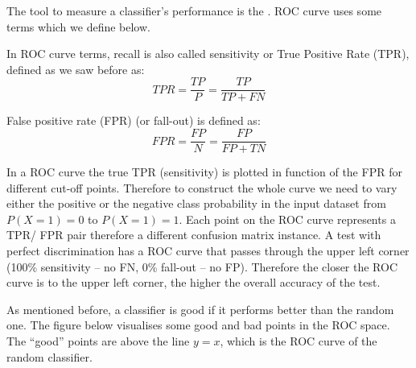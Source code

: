 \documentclass[a4paper]{article}
\begin{document}
The tool to measure a classifier's performance is the . ROC curve uses some terms which we define below.

\begin{definition}[sensitivity]
In ROC curve terms, recall is also called sensitivity or True Positive Rate (TPR), defined as we saw before as:
\begin{equation}
    TPR = \frac{TP}{P} = \frac{TP}{TP + FN}
\end{equation}
\end{definition}

\begin{definition}
False positive rate (FPR) (or fall-out) is defined as:
\begin{equation}
    FPR = \frac{FP}{N} = \frac{FP}{FP + TN}
\end{equation}
\end{definition}

In a ROC curve the true TPR (sensitivity) is plotted in function of the FPR for different cut-off points. Therefore to construct the whole curve we need to vary either the positive or the negative class probability in the input dataset from $P(X=1)=0$ to $P(X=1)=1$. Each point on the ROC curve represents a TPR/ FPR pair therefore a different confusion matrix instance. A test with perfect discrimination has a ROC curve that passes through the upper left corner (100\% sensitivity -- no FN, 0\% fall-out -- no FP). Therefore the closer the ROC curve is to the upper left corner, the higher the overall accuracy of the test.

As mentioned before, a classifier is good if it performs better than the random one. The figure below visualises some good and bad points in the ROC space. The ``good'' points are above the line $y=x$, which is the ROC curve of the random classifier.


\vspace{3cm}
\end{document}
